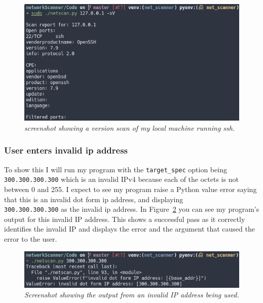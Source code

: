 \documentclass[titlepage]{article}
\let\Oldsubsubsection\subsubsection{}
\renewcommand{\subsubsection}{\FloatBarrier\Oldsubsubsection}
\begin{document}
\begin{figure}[H]
  \centering
  \includegraphics[width=\textwidth]{sshversiondetect.png}
  \caption{\textit{%
    screenshot showing a version scan of my local machine running ssh.
}}\label{versiondetecttest}
\end{figure}

\subsubsection{User enters invalid ip address}
To show this I will run my program with the \verb|target_spec|
option being \\
\verb|300.300.300.300| which is an invalid
IPv4 because each of the octets is not between 0 and 255.
I expect to see my program raise a Python value error
saying that this is an invalid dot form \gls{ip} address,
and displaying \\
\verb|300.300.300.300| as the invalid \gls{ip}
address. In Figure~\ref{invalidip} you can see my program's output
for this invalid IP address. This shows a successful pass as it
correctly identifies the invalid IP and displays the error
and the argument that caused the error to the user.

\begin{figure}[H]
  \centering
  \includegraphics[width=\textwidth]{invalidip.png}
  \caption{\textit{%
    Screenshot showing the output from an invalid IP address being used.
}}\label{invalidip}
\end{figure}
\end{document}
